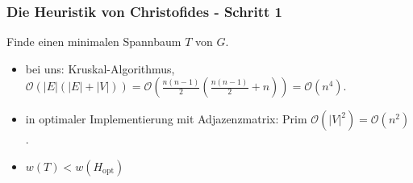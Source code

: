 \begin{frame}
    \frametitle{Die Heuristik von Christofides - Schritt 1}
    Finde einen minimalen Spannbaum $T$ von $G$.
    \begin{itemize}
        \item bei uns: Kruskal-Algorithmus, $\mathcal{O}(|E|(|E|+|V|)) = \mathcal{O}(\frac{n(n-1)}{2}(\frac{n(n-1)}{2}+n)) = \mathcal{O}(n^4)$.
        \item in optimaler Implementierung mit Adjazenzmatrix: Prim $\mathcal{O}(|V|^2) = \mathcal{O}(n^2)$.
        \item $w(T) < w(H_{\mathrm{opt}})$ %
    \end{itemize}
\end{frame}